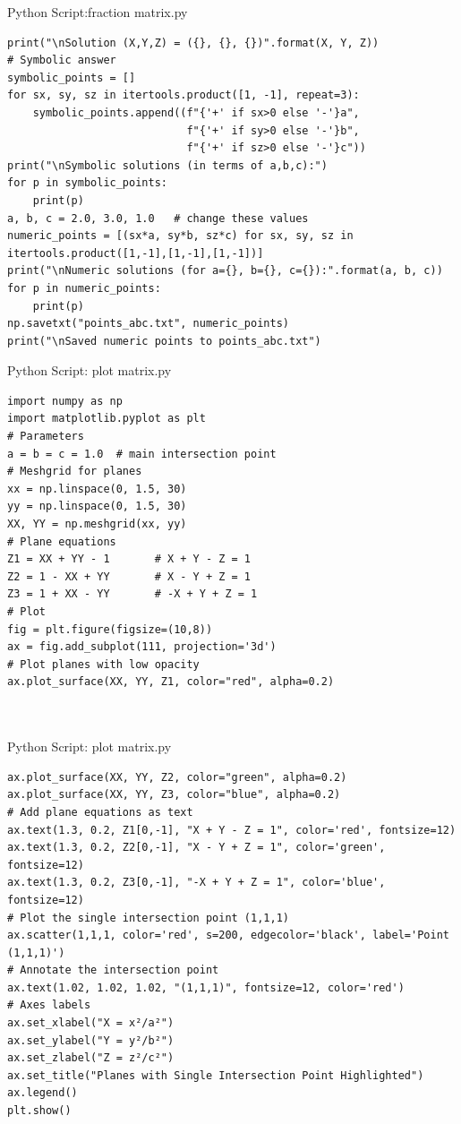 \documentclass{beamer}
\numberwithin{equation}{section}
\theoremstyle{remark}
\begin{document}
\begin{frame}[fragile]{Python Script:fraction matrix.py}
\begin{verbatim}
print("\nSolution (X,Y,Z) = ({}, {}, {})".format(X, Y, Z))
# Symbolic answer
symbolic_points = []
for sx, sy, sz in itertools.product([1, -1], repeat=3):
    symbolic_points.append((f"{'+' if sx>0 else '-'}a",
                            f"{'+' if sy>0 else '-'}b",
                            f"{'+' if sz>0 else '-'}c"))
print("\nSymbolic solutions (in terms of a,b,c):")
for p in symbolic_points:
    print(p)
a, b, c = 2.0, 3.0, 1.0   # change these values
numeric_points = [(sx*a, sy*b, sz*c) for sx, sy, sz in itertools.product([1,-1],[1,-1],[1,-1])]
print("\nNumeric solutions (for a={}, b={}, c={}):".format(a, b, c))
for p in numeric_points:
    print(p)
np.savetxt("points_abc.txt", numeric_points)
print("\nSaved numeric points to points_abc.txt")
\end{verbatim}
\end{frame}


\begin{frame}[fragile]{Python Script: plot matrix.py}
\begin{verbatim}
import numpy as np
import matplotlib.pyplot as plt
# Parameters
a = b = c = 1.0  # main intersection point
# Meshgrid for planes
xx = np.linspace(0, 1.5, 30)
yy = np.linspace(0, 1.5, 30)
XX, YY = np.meshgrid(xx, yy)
# Plane equations
Z1 = XX + YY - 1       # X + Y - Z = 1
Z2 = 1 - XX + YY       # X - Y + Z = 1
Z3 = 1 + XX - YY       # -X + Y + Z = 1
# Plot
fig = plt.figure(figsize=(10,8))
ax = fig.add_subplot(111, projection='3d')
# Plot planes with low opacity
ax.plot_surface(XX, YY, Z1, color="red", alpha=0.2)



\end{verbatim}
\end{frame}
\begin{frame}[fragile]{Python Script: plot matrix.py}
\begin{verbatim}
ax.plot_surface(XX, YY, Z2, color="green", alpha=0.2)
ax.plot_surface(XX, YY, Z3, color="blue", alpha=0.2)
# Add plane equations as text
ax.text(1.3, 0.2, Z1[0,-1], "X + Y - Z = 1", color='red', fontsize=12)
ax.text(1.3, 0.2, Z2[0,-1], "X - Y + Z = 1", color='green', fontsize=12)
ax.text(1.3, 0.2, Z3[0,-1], "-X + Y + Z = 1", color='blue', fontsize=12)
# Plot the single intersection point (1,1,1)
ax.scatter(1,1,1, color='red', s=200, edgecolor='black', label='Point (1,1,1)')
# Annotate the intersection point
ax.text(1.02, 1.02, 1.02, "(1,1,1)", fontsize=12, color='red')
# Axes labels
ax.set_xlabel("X = x²/a²")
ax.set_ylabel("Y = y²/b²")
ax.set_zlabel("Z = z²/c²")
ax.set_title("Planes with Single Intersection Point Highlighted")
ax.legend()
plt.show()

\end{verbatim}
\end{frame}
\end{document}
